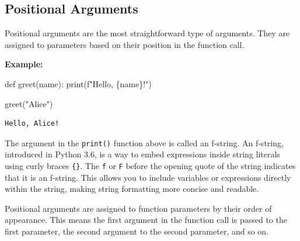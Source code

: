 \documentclass[
  letterpaper,
  DIV=11,
  numbers=noendperiod]{scrreprt}
\newenvironment{Shaded}{\begin{snugshade}}{\end{snugshade}}
\newcommand{\BuiltInTok}[1]{\textcolor[rgb]{0.00,0.23,0.31}{#1}}
\newcommand{\KeywordTok}[1]{\textcolor[rgb]{0.00,0.23,0.31}{#1}}
\newcommand{\NormalTok}[1]{\textcolor[rgb]{0.00,0.23,0.31}{#1}}
\newcommand{\SpecialCharTok}[1]{\textcolor[rgb]{0.37,0.37,0.37}{#1}}
\newcommand{\SpecialStringTok}[1]{\textcolor[rgb]{0.13,0.47,0.30}{#1}}
\newcommand{\StringTok}[1]{\textcolor[rgb]{0.13,0.47,0.30}{#1}}
\begin{document}
\hypertarget{positional-arguments}{%
\subsection{Positional Arguments}\label{positional-arguments}}

Positional arguments are the most straightforward type of arguments.
They are assigned to parameters based on their position in the function
call.

\textbf{Example:}

\begin{Shaded}
\begin{Highlighting}[]
\KeywordTok{def}\NormalTok{ greet(name):}
    \BuiltInTok{print}\NormalTok{(}\SpecialStringTok{f"Hello, }\SpecialCharTok{\{}\NormalTok{name}\SpecialCharTok{\}}\SpecialStringTok{!"}\NormalTok{)}

\NormalTok{greet(}\StringTok{"Alice"}\NormalTok{)}
\end{Highlighting}
\end{Shaded}

\begin{verbatim}
Hello, Alice!
\end{verbatim}

\begin{tcolorbox}[enhanced jigsaw, coltitle=black, colback=white, bottomrule=.15mm, arc=.35mm, titlerule=0mm, opacitybacktitle=0.6, toptitle=1mm, left=2mm, toprule=.15mm, opacityback=0, bottomtitle=1mm, title=\textcolor{quarto-callout-note-color}{\faInfo}\hspace{0.5em}{f-strings}, rightrule=.15mm, colframe=quarto-callout-note-color-frame, breakable, colbacktitle=quarto-callout-note-color!10!white, leftrule=.75mm]

The argument in the \texttt{print()} function above is called an
f-string. An f-string, introduced in Python 3.6, is a way to embed
expressions inside string literals using curly braces \texttt{\{\}}. The
\texttt{f} or \texttt{F} before the opening quote of the string
indicates that it is an f-string. This allows you to include variables
or expressions directly within the string, making string formatting more
concise and readable.

\end{tcolorbox}

Positional arguments are assigned to function parameters by their order
of appearance. This means the first argument in the function call is
passed to the first parameter, the second argument to the second
parameter, and so on.
\end{document}
